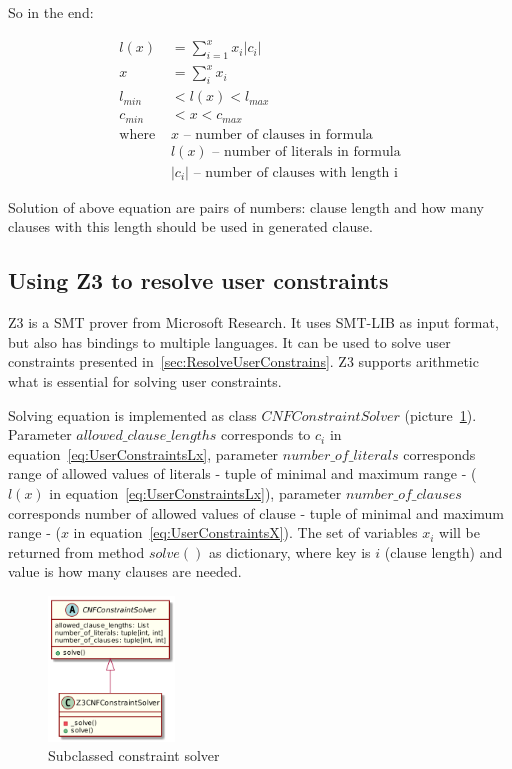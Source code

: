 So in the end:

\begin{align}
  l(x) &= \sum_{i=1}^{x} x_i |c_i|\label{eq:UserConstraintsLx} \\
  x &= \sum_i^x x_i\label{eq:UserConstraintsX} \\
  l_{min} &< l(x) < l_{max} \label{eq:UserConstraintsRangeL}\\
  c_{min} &< x < c_{max}\label{eq:UserConstraintsRangeC} \\
	\text{where } 
		&x \text{ -- number of clauses in formula} \nonumber \\
		&l(x) \text{ -- number of literals in formula} \nonumber  \\
		&|c_i| \text{ -- number of clauses with length i} \nonumber
\end{align}

Solution of above equation are pairs of numbers: clause length and how many clauses with this length should be used in generated clause.

\subsection{Using Z3 to resolve user constraints}

Z3 \cite{Z3Solver} is a \gls{SMT} prover from Microsoft Research. It uses SMT-LIB as input format, but also has bindings to multiple languages. It can be used to solve user constraints presented in~\ref{sec:ResolveUserConstrains}. Z3 supports arithmetic what is essential for solving user constraints.

Solving equation is implemented as class $CNFConstraintSolver$ (picture~\ref{pic:ConstraintSolverZ3ClassDiagram}). Parameter $allowed\_clause\_lengths$ corresponds to $c_i$ in equation~\ref{eq:UserConstraintsLx}, parameter $number\_of\_literals$ corresponds range of allowed values of literals - tuple of minimal and maximum range - ($l(x)$ in equation~\ref{eq:UserConstraintsLx}), parameter $number\_of\_clauses$ corresponds number of allowed values of clause - tuple of minimal and maximum range - ($x$ in equation~\ref{eq:UserConstraintsX}). The set of variables $x_i$ will be returned from method $solve()$ as dictionary, where key is $i$ (clause length) and value is how many clauses are needed.


\begin{figure}[h]
\begin{centering}
  \includegraphics[width=0.3\textwidth]{logic-formula-generator/fol/resolve_constraints.png}
  \caption{Subclassed constraint solver}
  \label{pic:ConstraintSolverZ3ClassDiagram}
\end{centering}
\end{figure}

